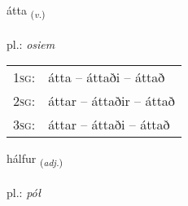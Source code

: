 \documentclass[frontgrid, backgrid]{flacards}\usepackage[]{graphicx}\usepackage[]{xcolor}
\begin{document}
\renewcommand{\flhead}{\vskip5pt \fboxsep=0pt {\small\bfseries\footnotesize Sagnorð | Verb}}
\renewcommand{\fcfoot}{\vskip5pt \fboxsep=0pt \hspace{2pt}{\small\bfseries\footnotesize 1K}}

\renewcommand{\blhead}{\vskip5pt {\small\bfseries\footnotesize Sagnorð | Verb }}
\renewcommand{\bcfoot}{\vskip5pt \hspace{2pt}{\small\bfseries\footnotesize 1K}}


{átta \small{\textsubscript{(\textit{v.})}} \\[1ex] %
\textphonetic{[auhta]} \\
pl.: \emph{osiem} \\  [2ex]
\renewcommand*{\arraystretch}{0.8}
\begin{tabular}{p{1cm}l}
\textsc{1sg}: & átta -- áttaði -- áttað \\ 
\textsc{2sg}: & áttar -- áttaðir -- áttað \\ 
\textsc{3sg}: & áttar -- áttaði -- áttað \\ 
\end{tabular}
}

\renewcommand{\flhead}{\vskip5pt \fboxsep=0pt {\small\bfseries\footnotesize Lýsingarorð | Adjective}}
\renewcommand{\fcfoot}{\vskip5pt \fboxsep=0pt \hspace{2pt}{\small\bfseries\footnotesize 1K}}

\renewcommand{\blhead}{\vskip5pt {\small\bfseries\footnotesize Lýsingarorð | Adjective }}
\renewcommand{\bcfoot}{\vskip5pt \hspace{2pt}{\small\bfseries\footnotesize 1K}}


{hálfur \small{\textsubscript{(\textit{adj.})}} \\[1ex] %
\textphonetic{[haulvʏr]} \\
pl.: \emph{pół} \\  [2ex]
\renewcommand*{\arraystretch}{0.8}
}
\end{document}
